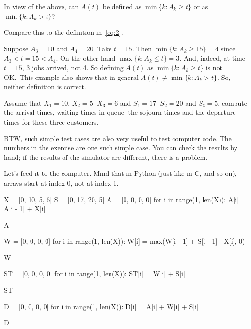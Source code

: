 \begin{exercise}\label{ex:22}
 In  view of the above, can $A(t)$ be defined as $\min\{k : A_k \geq t\}$ or as $\min\{k: A_k > t\}$? 
\begin{hint}
Compare this to the definition in~\cref{eq:2}.
\end{hint}
\begin{solution}
  Suppose $A_3 = 10$ and $A_4 = 20$.
  Take $t=15$.
  Then $\min\{k : A_k \geq 15\} = 4$ since $A_3 < t=15 < A_4$.
  On the other hand $\max\{k : A_k \leq t\} = 3$.
  And, indeed, at time $t=15$, 3 jobs arrived, not 4.
  So defining $A(t)$ as $\min\{k : A_k \geq t\}$ is not OK.\
  This example also shows that in general $A(t) \neq \min\{k : A_k > t\}$.
  So, neither definition is correct.
\end{solution}
\end{exercise}



\begin{exercise}\label{ex:82}   
 Assume  that $X_1=10$, $X_2=5$, $X_3=6$ and $S_1 = 17$, $S_2=20$ and $S_3=5$, compute the arrival times, waiting times in queue, the sojourn times and the departure times for these three customers.
\begin{hint}

 BTW, such simple test cases are also very useful to test computer code.
 The numbers in the exercise are one such simple case.
 You can check the results by hand; if the results of the simulator are different, there is a problem.
\end{hint}
\begin{solution} Let's feed it to the computer. Mind that in Python (just like in C, and so on), arrays start at index 0, not at index 1. 
\begin{pyconsole}
X = [0, 10, 5, 6]
S = [0, 17, 20, 5]
A = [0, 0, 0, 0]
for i in range(1, len(X)):
    A[i] = A[i - 1] + X[i]

A

W = [0, 0, 0, 0]
for i in range(1, len(X)):
    W[i] = max(W[i - 1] + S[i - 1] - X[i], 0)

W

ST = [0, 0, 0, 0]
for i in range(1, len(X)):
    ST[i] = W[i] + S[i]

ST

D = [0, 0, 0, 0]
for i in range(1, len(X)):
    D[i] = A[i] + W[i] + S[i]

D
\end{pyconsole}
 
\end{solution}
\end{exercise}



